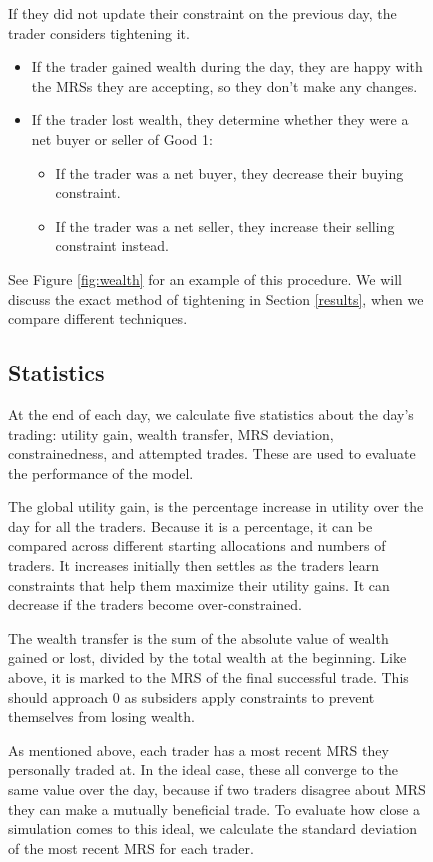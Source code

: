 \documentclass[12pt,a4paper,titlepage]{article}
\begin{document}
\begin{figure}[H]
If they did not update their constraint on the previous day, the trader considers tightening it.
\begin{itemize}
  \item If the trader gained wealth during the day, they are happy with the MRSs they are accepting, so they don't make any changes.
  \item If the trader lost wealth, they determine whether they were a net buyer or seller of Good 1:
    \begin{itemize}
      \item If the trader was a net buyer, they decrease their buying constraint.
      \item If the trader was a net seller, they increase their selling constraint instead.
    \end{itemize}
\end{itemize}

See Figure \ref{fig:wealth} for an example of this procedure.
We will discuss the exact method of tightening in Section \ref{results}, when we compare different techniques.

\subsection{Statistics}
At the end of each day, we calculate five statistics about the day's trading: utility gain, wealth transfer, MRS deviation, constrainedness, and attempted trades.
These are used to evaluate the performance of the model.

The global utility gain, is the percentage increase in utility over the day for all the traders. 
Because it is a percentage, it can be compared across different starting allocations and numbers of traders.
It increases initially then settles as the traders learn constraints that help them maximize their utility gains.
It can decrease if the traders become over-constrained.

The wealth transfer is the sum of the absolute value of wealth gained or lost, divided by the total wealth at the beginning.
Like above, it is marked to the MRS of the final successful trade.
This should approach 0 as subsiders apply constraints to prevent themselves from losing wealth.

As mentioned above, each trader has a most recent MRS they personally traded at.
In the ideal case, these all converge to the same value over the day, because if two traders disagree about MRS they can make a mutually beneficial trade.
To evaluate how close a simulation comes to this ideal, we calculate the standard deviation of the most recent MRS for each trader.


\end{figure}
\end{document}

